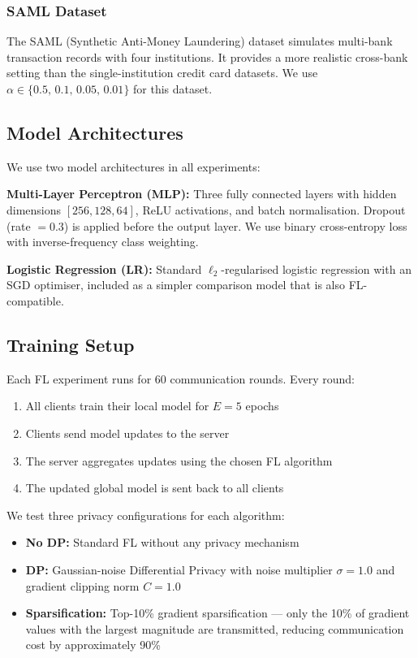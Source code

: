 \documentclass[12pt, a4paper]{article}
\begin{document}
\subsubsection{SAML Dataset}

The SAML (Synthetic Anti-Money Laundering) dataset simulates multi-bank transaction records with four institutions. It provides a more realistic cross-bank setting than the single-institution credit card datasets. We use $\alpha \in \{0.5,\, 0.1,\, 0.05,\, 0.01\}$ for this dataset.

\subsection{Model Architectures}

We use two model architectures in all experiments:

\textbf{Multi-Layer Perceptron (MLP):} Three fully connected layers with hidden dimensions $[256, 128, 64]$, ReLU activations, and batch normalisation. Dropout (rate $= 0.3$) is applied before the output layer. We use binary cross-entropy loss with inverse-frequency class weighting.

\textbf{Logistic Regression (LR):} Standard $\ell_2$-regularised logistic regression with an SGD optimiser, included as a simpler comparison model that is also FL-compatible.

\subsection{Training Setup}

Each FL experiment runs for 60 communication rounds. Every round:
\begin{enumerate}[leftmargin=*, label=\arabic*.]
\item All clients train their local model for $E = 5$ epochs
\item Clients send model updates to the server
\item The server aggregates updates using the chosen FL algorithm
\item The updated global model is sent back to all clients
\end{enumerate}

We test three privacy configurations for each algorithm:
\begin{itemize}[noitemsep]
\item \textbf{No DP:} Standard FL without any privacy mechanism
\item \textbf{DP:} Gaussian-noise Differential Privacy with noise multiplier $\sigma = 1.0$ and gradient clipping norm $C = 1.0$
\item \textbf{Sparsification:} Top-10\% gradient sparsification --- only the 10\% of gradient values with the largest magnitude are transmitted, reducing communication cost by approximately 90\%
\end{itemize}
\end{document}
